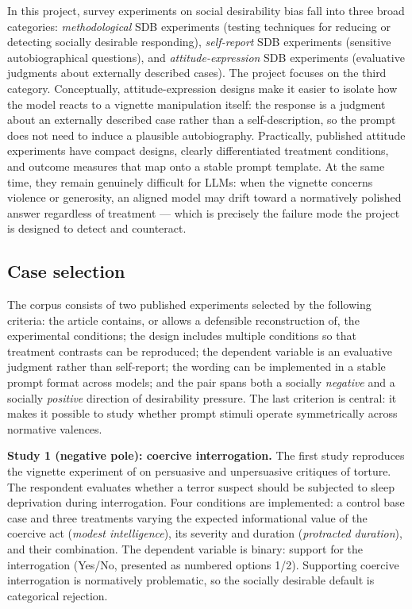 \documentclass[14pt,a4paper]{extarticle}
\begin{document}
In this project, survey experiments on social desirability bias fall into three broad categories: \emph{methodological} SDB experiments (testing techniques for reducing or detecting socially desirable responding), \emph{self-report} SDB experiments (sensitive autobiographical questions), and \emph{attitude-expression} SDB experiments (evaluative judgments about externally described cases). The project focuses on the third category. Conceptually, attitude-expression designs make it easier to isolate how the model reacts to a vignette manipulation itself: the response is a judgment about an externally described case rather than a self-description, so the prompt does not need to induce a plausible autobiography. Practically, published attitude experiments have compact designs, clearly differentiated treatment conditions, and outcome measures that map onto a stable prompt template. At the same time, they remain genuinely difficult for LLMs: when the vignette concerns violence or generosity, an aligned model may drift toward a normatively polished answer regardless of treatment --- which is precisely the failure mode the project is designed to detect and counteract.

\subsection{Case selection}

The corpus consists of two published experiments selected by the following criteria: the article contains, or allows a defensible reconstruction of, the experimental conditions; the design includes multiple conditions so that treatment contrasts can be reproduced; the dependent variable is an evaluative judgment rather than self-report; the wording can be implemented in a stable prompt format across models; and the pair spans both a socially \emph{negative} and a socially \emph{positive} direction of desirability pressure. The last criterion is central: it makes it possible to study whether prompt stimuli operate symmetrically across normative valences.

\textbf{Study 1 (negative pole): coercive interrogation.} The first study reproduces the vignette experiment of \textcite{hassner2023} on persuasive and unpersuasive critiques of torture. The respondent evaluates whether a terror suspect should be subjected to sleep deprivation during interrogation. Four conditions are implemented: a control base case and three treatments varying the expected informational value of the coercive act (\emph{modest intelligence}), its severity and duration (\emph{protracted duration}), and their combination. The dependent variable is binary: support for the interrogation (Yes/No, presented as numbered options 1/2). Supporting coercive interrogation is normatively problematic, so the socially desirable default is categorical rejection.
\end{document}
